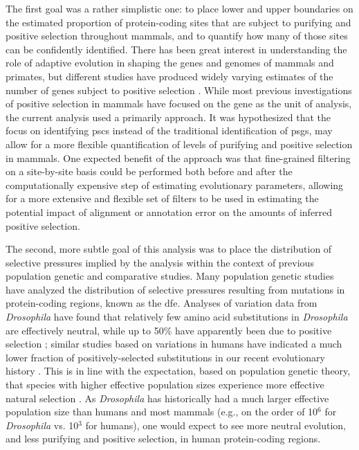 The first goal was a rather simplistic one: to place lower and upper
boundaries on the estimated proportion of protein-coding sites that
are subject to purifying and positive selection throughout mammals,
and to quantify how many of those sites can be confidently
identified. There has been great interest in understanding the role of
adaptive evolution in shaping the genes and genomes of mammals and
primates, but different studies have produced widely varying estimates
of the number of genes subject to positive selection
\citep{MarquesBonet2009a,ELLEGREN2008}. While most previous
investigations of positive selection in mammals have focused on the
gene as the unit of analysis, the current analysis used a primarily
\sw approach. It was hypothesized that the focus on identifying
\acp{psc} instead of the traditional identification of \acp{psg}, may
allow for a more flexible quantification of levels of purifying and
positive selection in mammals. One expected benefit of the \sw
approach was that fine-grained filtering on a site-by-site basis could
be performed both before and after the computationally expensive step
of estimating evolutionary parameters, allowing for a more extensive
and flexible set of filters to be used in estimating the potential
impact of alignment or annotation error on the amounts of inferred
positive selection.

The second, more subtle goal of this analysis was to place the
distribution of selective pressures implied by the \sw analysis within
the context of previous population genetic and comparative
studies. Many population genetic studies have analyzed the
distribution of selective pressures resulting from mutations in
protein-coding regions, known as the \ac{dfe}. Analyses of variation
data from \emph{Drosophila} have found that relatively few amino acid
substitutions in \emph{Drosophila} are effectively neutral, while up
to 50\% have apparently been due to positive selection
\citep{Loewe2006,EyreWalker2007}; similar studies based on variations
in humans have indicated a much lower fraction of positively-selected
substitutions in our recent evolutionary history
\citep{EyreWalker2006a,Boyko2008}. This is in line with the
expectation, based on population genetic theory, that species with
higher effective population sizes experience more effective natural
selection \citep{EyreWalker2007}. As \emph{Drosophila} has
historically had a much larger effective population size than humans
and most mammals (e.g., on the order of 10$^{6}$ for \emph{Drosophila}
vs. 10$^{3}$ for humans), one would expect to see more neutral
evolution, and less purifying and positive selection, in human
protein-coding regions.

